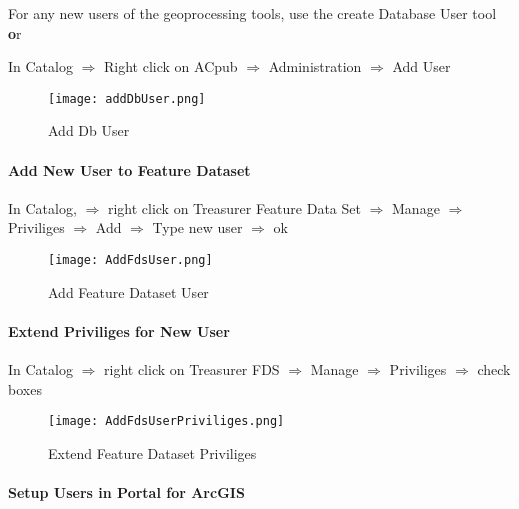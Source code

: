 \documentclass[class=book , crop=false, titlepage, twoside, multi={itemize, figure, verbatim}, float=false]{standalone}
\begin{document}
\noindent For any new users of the geoprocessing tools, use the create Database User tool {\textbf or}
\vspace{.5in}

\noindent In Catalog $\Rightarrow$ Right click on ACpub $\Rightarrow$ Administration $\Rightarrow$ Add User
%
%
\begin{figure}[h!]
\centering
    \texttt{[image: addDbUser.png]}
\caption{Add Db User}
\end{figure}
\clearpage
%
%
%
\paragraph[Add New User to Feature Dataset]{\Large Add New User to Feature Dataset\texorpdfstring{\\}{}}
\vspace{.5in}

In Catalog, $\Rightarrow$ right click on Treasurer Feature Data Set $\Rightarrow$ Manage $\Rightarrow$ Priviliges $\Rightarrow$ Add $\Rightarrow$ Type new user $\Rightarrow$ ok
\vspace{.5in}

%
%
\begin{figure}[h!]
\centering
    \texttt{[image: AddFdsUser.png]}
\caption{Add Feature Dataset User}
\end{figure}
\clearpage
%
%
%
\paragraph[Extend Priviliges for New User]{\Large Extend Priviliges for New User\texorpdfstring{\\}{}}
\vspace{.5in}

In Catalog $\Rightarrow$ right click on Treasurer FDS $\Rightarrow$ Manage $\Rightarrow$ Priviliges $\Rightarrow$ check boxes
\vspace{.5in}

%
%
\begin{figure}[h!]
\centering
    \texttt{[image: AddFdsUserPriviliges.png]}
\caption{Extend Feature Dataset Priviliges}
\end{figure}
\clearpage
%
%
%
\paragraph[Setup Users in Portal for ArcGIS]{\Large Setup Users in Portal for ArcGIS\texorpdfstring{\\}{}}
\vspace{.5in}
\end{document}
